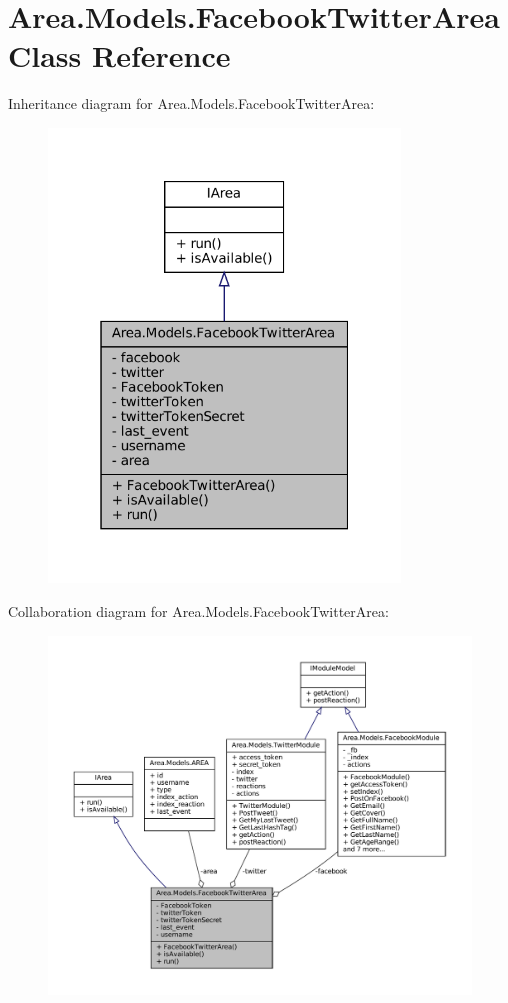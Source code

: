 \hypertarget{classArea_1_1Models_1_1FacebookTwitterArea}{}\section{Area.\+Models.\+Facebook\+Twitter\+Area Class Reference}
\label{classArea_1_1Models_1_1FacebookTwitterArea}


Inheritance diagram for Area.\+Models.\+Facebook\+Twitter\+Area\+:
\nopagebreak
\begin{figure}[H]
\begin{center}
\leavevmode
\includegraphics[width=265pt]{classArea_1_1Models_1_1FacebookTwitterArea__inherit__graph}
\end{center}
\end{figure}


Collaboration diagram for Area.\+Models.\+Facebook\+Twitter\+Area\+:
\nopagebreak
\begin{figure}[H]
\begin{center}
\leavevmode
\includegraphics[width=350pt]{classArea_1_1Models_1_1FacebookTwitterArea__coll__graph}
\end{center}
\end{figure}
